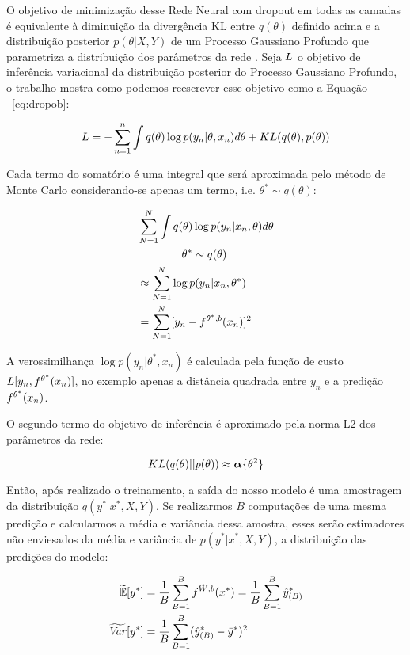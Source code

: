 O objetivo de minimização desse Rede Neural com dropout em todas as camadas é
equivalente à diminuição da divergência KL entre $q(\theta)$ definido acima e a distribuição
posterior $p(\theta | X,Y)$ de um Processo Gaussiano Profundo que parametriza a
distribuição dos parâmetros da rede \citep{dropbayes}. Seja $\mathnormal{L}$ o
objetivo de inferência variacional da distribuição posterior do Processo Gaussiano Profundo, o trabalho
\citep{dropbayes} mostra como podemos reescrever esse objetivo como a Equação ~\ref{eq:dropob}:

\[
    \mathnormal{L} = - \sum^n_{n=1}\int{q(\theta)  \log p(y_n | \theta,x_n)}d\theta + \mathnormal{KL}(q(\theta),p(\theta))
\]


Cada termo do somatório é uma integral que será aproximada pelo método de Monte Carlo 
considerando-se apenas um termo, i.e. $\theta^* \sim q(\theta)$:

\begin{align*}
                    &\sum^N_{N=1} \int q(\theta) \log p(y_n | x_n,\theta)d\theta \\ 
                    &\qquad \qquad  \theta^* \sim q(\theta) \\
                    &\approx \sum^N_{N=1} \log p(y_n | x_n,\theta^*) \\
                    &= \sum^N_{N=1} [y_n - \mathnormal{f}^{\theta^*,b}(x_n)]^2
\end{align*}

A verossimilhança $\log p(y_n | \theta^*,x_n)$ é calculada pela
função de custo $L[y_n,\mathnormal{f}^{\theta^*}(x_n)]$, no exemplo apenas a distância quadrada
entre $y_n$ e a predição $\mathnormal{f}^{\theta^*}(x_n)$.

O segundo termo do objetivo de inferência é aproximado pela norma L2 dos
parâmetros da rede:

\begin{equation}
    \mathnormal{KL}(q(\theta) ||p(\theta)) \approx \boldsymbol{\alpha}\{\theta^2\}
 \end{equation} 

Então, após realizado o treinamento, a saída do nosso modelo é uma amostragem da
distribuição $q(y^* | x^*,X,Y)$. Se realizarmos $B$ computações de uma mesma
predição e calcularmos a média e variância dessa amostra, esses serão
estimadores não enviesados da média e variância de $p(y^*|x^*,X,Y)$, a
distribuição das predições do modelo:


\begin{align*}
  \label{eq:aproxs}
  \widetilde{\mathbb{E}}[y^*] &=
   \frac{1}{B}\sum^B_{B=1}\mathnormal{f}^{\hat{W},b}(x^*) = \frac{1}{B}\sum^B_{B=1}\hat{y}^*_{(B)}\\ 
   \widetilde{\mathit{Var}}[y^*]  &= \frac{1}{B}\sum^B_{B=1}(\hat{y}^*_{(B)} - \bar{y}^*)^2 
 \end{align*}


